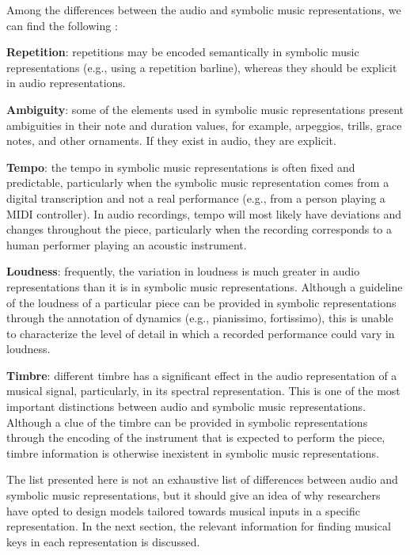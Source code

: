 
Among the differences between the audio and symbolic music
representations, we can find the following
\parencite{fremerey2009towards}:

\textbf{Repetition}: repetitions may be encoded semantically
in symbolic music representations (e.g., using a repetition
barline), whereas they should be explicit in audio
representations.

\textbf{Ambiguity}: some of the elements used in symbolic
music representations present ambiguities in their note and
duration values, for example, arpeggios, trills, grace
notes, and other ornaments. If they exist in audio, they are
explicit.

\textbf{Tempo}: the tempo in symbolic music representations
is often fixed and predictable, particularly when the
symbolic music representation comes from a digital
transcription and not a real performance (e.g., from a
person playing a MIDI controller). In audio recordings,
tempo will most likely have deviations and changes
throughout the piece, particularly when the recording
corresponds to a human performer playing an acoustic
instrument.

\textbf{Loudness}: frequently, the variation in loudness is
much greater in audio representations than it is in symbolic
music representations. Although a guideline of the loudness
of a particular piece can be provided in symbolic
representations through the annotation of dynamics (e.g.,
pianissimo, fortissimo), this is unable to characterize the
level of detail in which a recorded performance could vary
in loudness.

\textbf{Timbre}: different timbre has a significant effect
in the audio representation of a musical signal,
particularly, in its spectral representation. This is one of
the most important distinctions between audio and symbolic
music representations. Although a clue of the timbre can be
provided in symbolic representations through the encoding of
the instrument that is expected to perform the piece, timbre
information is otherwise inexistent in symbolic music
representations.

The list presented here is not an exhaustive list of
differences between audio and symbolic music
representations, but it should give an idea of why
researchers have opted to design models tailored towards
musical inputs in a specific representation. In the next
section, the relevant information for finding musical keys
in each representation is discussed.


